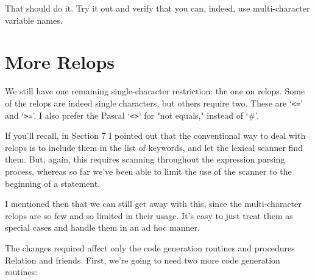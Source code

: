 That should do it. Try it out and verify  that  you can, indeed, use multi-character variable names.

\section{More Relops}

We still have one remaining single-character restriction: the one on relops. Some of the relops are indeed single  characters, but others  require two. These are `\verb|<=|' and `\verb|>=|'. I also prefer the Pascal `\verb|<>|' for "not equals,"  instead of `\#'.

If you'll recall, in Section 7 I pointed out that the conventional way  to  deal  with  relops  is  to  include them in the list  of keywords, and let the  lexical  scanner  find  them. But, again, this requires scanning throughout the expression parsing process, whereas so far we've been able to limit the use of the scanner to the beginning of a statement.

I mentioned then that we can still get away with this, since the multi-character relops are so few  and so limited in their usage. It's easy to just treat them as special cases and handle  them in an ad hoc manner.

The changes required affect only the code generation routines and procedures Relation and friends. First, we're going to need two more code generation routines:

